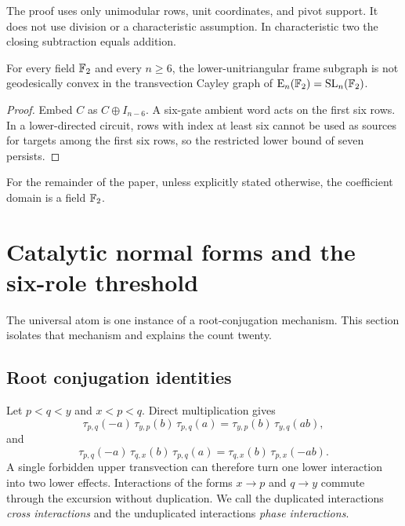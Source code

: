 \begin{remark}
The proof uses only unimodular rows, unit coordinates, and pivot support.  It does not use division or a characteristic assumption.  In characteristic two the closing subtraction equals addition.
\end{remark}

\begin{corollary}\label{g:cor:nonconvex}
For every field $\mathbb F_2$ and every $n\ge6$, the lower-unitriangular frame subgraph is not geodesically convex in the transvection Cayley graph of $\operatorname{E}_n(\mathbb F_2)=\operatorname{SL}_n(\mathbb F_2)$.
\end{corollary}

\begin{proof}
Embed $C$ as $C\oplus I_{n-6}$.  A six-gate ambient word acts on the first six rows.  In a lower-directed circuit, rows with index at least six cannot be used as sources for targets among the first six rows, so the restricted lower bound of seven persists.
\end{proof}

For the remainder of the paper, unless explicitly stated otherwise, the coefficient domain is a field $\mathbb F_2$.

\section{Catalytic normal forms and the six-role threshold}\label{g:sec:catalysis}

The universal atom is one instance of a root-conjugation mechanism.  This section isolates that mechanism and explains the count twenty.

\subsection{Root conjugation identities}

Let $p<q<y$ and $x<p<q$.  Direct multiplication gives
\begin{equation}\label{g:eq:read-conjugation}
\tau_{p,q}(-a)\,\tau_{y,p}(b)\,\tau_{p,q}(a)
=
\tau_{y,p}(b)\,\tau_{y,q}(ab),
\end{equation}
and
\begin{equation}\label{g:eq:update-conjugation}
\tau_{p,q}(-a)\,\tau_{q,x}(b)\,\tau_{p,q}(a)
=
\tau_{q,x}(b)\,\tau_{p,x}(-ab).
\end{equation}
A single forbidden upper transvection can therefore turn one lower interaction into two lower effects.  Interactions of the forms $x\to p$ and $q\to y$ commute through the excursion without duplication.  We call the duplicated interactions \emph{cross interactions} and the unduplicated interactions \emph{phase interactions}.

